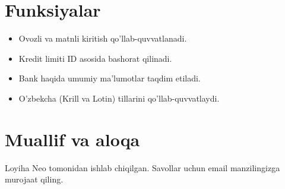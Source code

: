 \documentclass[a4paper,12pt]{article}
\begin{document}
\section{Funksiyalar}
\begin{itemize}
    \item Ovozli va matnli kiritish qo'llab-quvvatlanadi.
    \item Kredit limiti ID asosida bashorat qilinadi.
    \item Bank haqida umumiy ma'lumotlar taqdim etiladi.
    \item O'zbekcha (Krill va Lotin) tillarini qo'llab-quvvatlaydi.
\end{itemize}

\section{Muallif va aloqa}
Loyiha Neo tomonidan ishlab chiqilgan. Savollar uchun email manzilingizga murojaat qiling.
\end{document}
